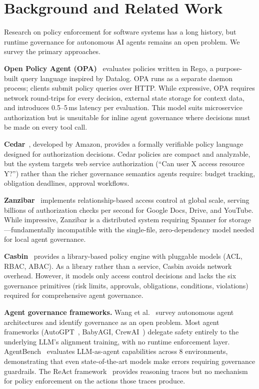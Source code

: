 \documentclass[10pt, twocolumn]{article}
\begin{document}
\section{Background and Related Work}
\label{sec:related}

Research on policy enforcement for software systems has a long history, but runtime governance for autonomous AI agents remains an open problem. We survey the primary approaches.

\textbf{Open Policy Agent (OPA)}~\cite{opa2018} evaluates policies written in Rego, a purpose-built query language inspired by Datalog. OPA runs as a separate daemon process; clients submit policy queries over HTTP. While expressive, OPA requires network round-trips for every decision, external state storage for context data, and introduces 0.5--5\,ms latency per evaluation. This model suits microservice authorization but is unsuitable for inline agent governance where decisions must be made on every tool call.

\textbf{Cedar}~\cite{cedar2023}, developed by Amazon, provides a formally verifiable policy language designed for authorization decisions. Cedar policies are compact and analyzable, but the system targets web service authorization (``Can user X access resource Y?'') rather than the richer governance semantics agents require: budget tracking, obligation deadlines, approval workflows.

\textbf{Zanzibar}~\cite{zanzibar2019} implements relationship-based access control at global scale, serving billions of authorization checks per second for Google Docs, Drive, and YouTube. While impressive, Zanzibar is a distributed system requiring Spanner for storage---fundamentally incompatible with the single-file, zero-dependency model needed for local agent governance.

\textbf{Casbin}~\cite{casbin} provides a library-based policy engine with pluggable models (ACL, RBAC, ABAC). As a library rather than a service, Casbin avoids network overhead. However, it models only access control decisions and lacks the six governance primitives (risk limits, approvals, obligations, conditions, violations) required for comprehensive agent governance.

\textbf{Agent governance frameworks.} Wang et al.~\cite{agents2024} survey autonomous agent architectures and identify governance as an open problem. Most agent frameworks (AutoGPT~\cite{autogpt2023}, BabyAGI, CrewAI~\cite{crewai2024}) delegate safety entirely to the underlying LLM's alignment training, with no runtime enforcement layer. AgentBench~\cite{agentbench2023} evaluates LLM-as-agent capabilities across 8 environments, demonstrating that even state-of-the-art models make errors requiring governance guardrails. The ReAct framework~\cite{react2022} provides reasoning traces but no mechanism for policy enforcement on the actions those traces produce.
\end{document}
